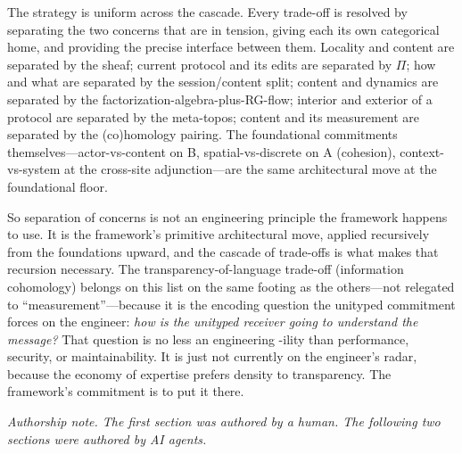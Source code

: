 \documentclass[11pt]{article}
\begin{document}
The strategy is uniform across the cascade. Every trade-off is resolved by
separating the two concerns that are in tension, giving each its own
categorical home, and providing the precise interface between them. Locality
and content are separated by the sheaf; current protocol and its edits are
separated by \(\Pi\); how and what are separated by the session/content split;
content and dynamics are separated by the factorization-algebra-plus-RG-flow;
interior and exterior of a protocol are separated by the meta-topos; content
and its measurement are separated by the (co)homology pairing. The foundational
commitments themselves---actor-vs-content on B, spatial-vs-discrete on A
(cohesion), context-vs-system at the cross-site adjunction---are the same
architectural move at the foundational floor.

So separation of concerns is not an engineering principle the framework
happens to use. It is the framework's primitive architectural move, applied
recursively from the foundations upward, and the cascade of trade-offs is what
makes that recursion necessary. The transparency-of-language trade-off
(information cohomology) belongs on this list on the same footing as the
others---not relegated to ``measurement''---because it is the encoding question
the unityped commitment forces on the engineer: \emph{how is the unityped
receiver going to understand the message?} That question is no less an
engineering -ility than performance, security, or maintainability. It is just
not currently on the engineer's radar, because the economy of expertise prefers
density to transparency. The framework's commitment is to put it there.

\par\bigskip
\noindent\emph{Authorship note. The first section was authored by a human. The following two
sections were authored by AI agents.}
\end{document}
